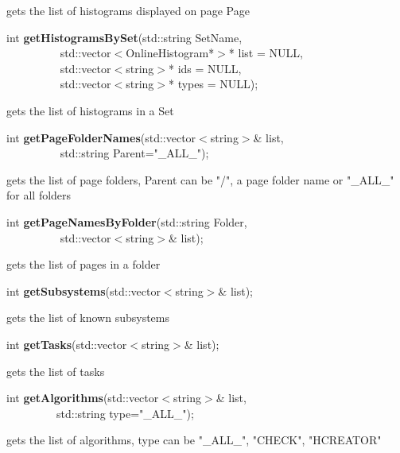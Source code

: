  gets the list of histograms displayed on page Page


\item    int {\bf getHistogramsBySet}(std::string SetName,\\\mbox{}~~~~~~~~~
			 std::vector$<$OnlineHistogram*$>$* list = NULL,\\\mbox{}~~~~~~~~~
			 std::vector$<$string$>$* ids = NULL,\\\mbox{}~~~~~~~~~
			 std::vector$<$string$>$* types = NULL);

 gets the list of histograms in a Set


\item    int {\bf getPageFolderNames}(std::vector$<$string$>$\& list,\\\mbox{}~~~~~~~~~ std::string Parent="\_ALL\_");


 gets the list of page folders, Parent can be "/", a page folder name or "\_ALL\_" for all folders  


\item    int {\bf getPageNamesByFolder}(std::string Folder,\\\mbox{}~~~~~~~~~
			   std::vector$<$string$>$\& list);

 gets the list of pages in a folder


\item    int {\bf getSubsystems}(std::vector$<$string$>$\& list);


 gets the list of known subsystems


\item    int {\bf getTasks}(std::vector$<$string$>$\& list);


 gets the list of tasks


\item    int {\bf getAlgorithms}(std::vector$<$string$>$\& list,\\\mbox{}~~~~~~~~~std::string type="\_ALL\_");


 gets the list of algorithms, type can be "\_ALL\_", "CHECK", "HCREATOR"


